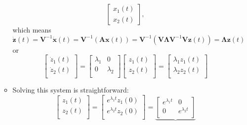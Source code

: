 \documentclass[12pt,a4paper]{article}
\begin{document}
\begin{itemize}
\begin{itemize}
\begin{equation}
\begin{bmatrix}
        x_{1}(t) \\ x_{2}(t)
      \end{bmatrix},
    \end{equation}
    which means
    \begin{equation}\nonumber%
      \dot{\bm{z}}(t)
      = \bm{V}^{-1}\dot{\bm{x}}(t)
      = \bm{V}^{-1}\left(\bm{A}\bm{x}(t)\right)
      = \bm{V}^{-1}\left(\bm{V}\bm{\Lambda}\bm{V}^{-1}\bm{V}\bm{z}(t)\right)
      = \bm{\Lambda}\bm{z}(t)
    \end{equation}
    or
    \begin{equation}\nonumber%
      \begin{bmatrix}
        \dot{z}_{1}(t)\\
        \dot{z}_{2}(t)\\
      \end{bmatrix}
      =
      \begin{bmatrix}
        \lambda_{1} & 0 \\
        0 & \lambda_{2} \\
      \end{bmatrix}
      \begin{bmatrix}
        z_{1}(t)\\
        z_{2}(t)\\
      \end{bmatrix}
      =
      \begin{bmatrix}
        \lambda_{1} z_{1}(t)\\
        \lambda_{2} z_{2}(t)\\
      \end{bmatrix}
    \end{equation}
  \item Solving this system is straightforward:
    \begin{equation}\nonumber%
      \begin{bmatrix}
        z_{1}(t)\\
        z_{2}(t)\\
      \end{bmatrix}
      =
      \begin{bmatrix}
        e^{\lambda_{1} t}z_{1}(0)\\
        e^{\lambda_{2} t}z_{2}(0)\\
      \end{bmatrix}
      =
      \underbrace{
      \begin{bmatrix}
        e^{\lambda_{1} t} & 0\\
        0 & e^{\lambda_{2} t} \\

\end{bmatrix}}
\end{equation}
\end{itemize}
\end{itemize}
\end{document}
